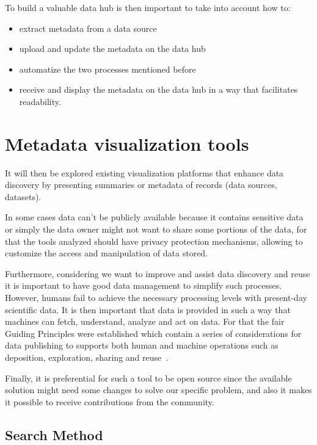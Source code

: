 To build a valuable data hub is then important to take into account how to:
\begin{itemize}
    \item extract metadata from a data source
    \item upload and update the metadata on the data hub
    \item automatize the two processes mentioned before
    \item receive and display the metadata on the data hub in a way that facilitates
        readability.
\end{itemize}

\section{Metadata visualization tools}
It will then be explored existing visualization platforms that enhance data discovery
by presenting summaries or metadata of records (data sources, datasets).

In some cases data can't be publicly available because it contains sensitive data or
simply the data owner might not want to share some portions of the data, for that the
tools analyzed should have privacy protection mechanisms, allowing to customize the
access and manipulation of data stored.

Furthermore, considering we want to improve and assist data discovery and reuse it is
important to have good data management to simplify such processes.
However, humans fail to achieve the necessary processing levels with present-day
scientific data.
It is then important that data is provided in such a way that machines can fetch,
understand, analyze and act on data.
For that the \gls{fair} Guiding Principles were established which contain a series of
considerations for data publishing to supports both human and machine operations such
as deposition, exploration, sharing and reuse~\cite{fair}.

Finally, it is preferential for such a tool to be open source since the available
solution might need some changes to solve our specific problem, and also it makes it
possible to receive contributions from the community.

\subsection{Search Method}

